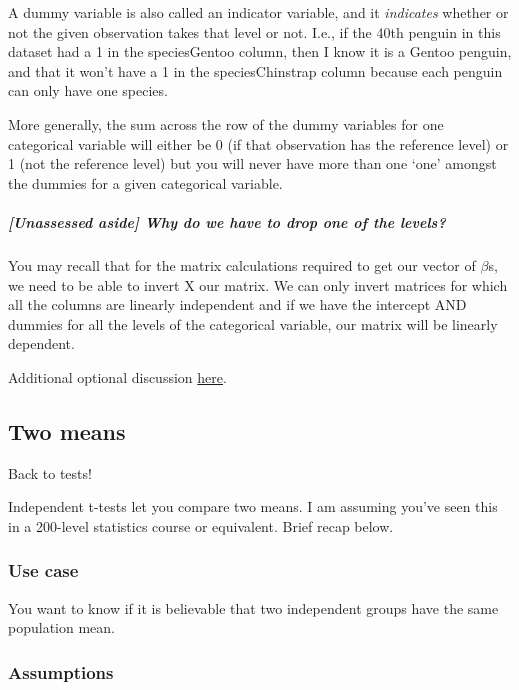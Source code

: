 \documentclass[
  openany]{book}
\begin{document}
A dummy variable is also called an indicator variable, and it \emph{indicates} whether or not the given observation takes that level or not. I.e., if the 40th penguin in this dataset had a 1 in the speciesGentoo column, then I know it is a Gentoo penguin, and that it won't have a 1 in the speciesChinstrap column because each penguin can only have one species.

More generally, the sum across the row of the dummy variables for one categorical variable will either be 0 (if that observation has the reference level) or 1 (not the reference level) but you will never have more than one `one' amongst the dummies for a given categorical variable.

\hypertarget{unassessed-aside-why-do-we-have-to-drop-one-of-the-levels}{%
\subparagraph{{[}Unassessed aside{]} Why do we have to drop one of the levels?}\label{unassessed-aside-why-do-we-have-to-drop-one-of-the-levels}}

You may recall that for the matrix calculations required to get our vector of \(\beta\)s, we need to be able to invert X our matrix. We can only invert matrices for which all the columns are linearly independent and if we have the intercept AND dummies for all the levels of the categorical variable, our matrix will be linearly dependent.

Additional optional discussion \protect\hyperlink{matrices}{here}.

\hypertarget{two-means}{%
\subsection{Two means}\label{two-means}}

Back to tests!

Independent t-tests let you compare two means. I am assuming you've seen this in a 200-level statistics course or equivalent. Brief recap below.

\hypertarget{use-case-1}{%
\subsubsection{Use case}\label{use-case-1}}

You want to know if it is believable that two independent groups have the same population mean.

\hypertarget{assumptions-1}{%
\subsubsection{Assumptions}\label{assumptions-1}}
\end{document}
